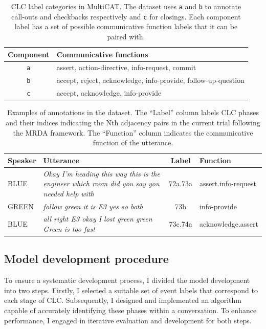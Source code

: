 \documentclass[11pt]{article}
\begin{document}
\begin{table}
    \centering
    \footnotesize
    \begin{tabularx}{\linewidth}{cX}
    \toprule
    Component & Communicative functions \\
    \midrule
       \texttt{a} & assert, action-directive, info-request, commit \\
       \texttt{b} & accept, reject, acknowledge, info-provide, follow-up-question \\
       \texttt{c} & accept, acknowledge, info-provide \\
       \bottomrule
    \end{tabularx}
    \caption{%
        CLC label categories in MultiCAT.
        The dataset uses \texttt{a} and \texttt{b} to annotate call-outs and checkbacks respectively and \texttt{c} for closings. Each component label has a set of possible communicative function labels that it can be paired with. 
    }
    \label{tab:clc-label-category}
\end{table}

\begin{table}
    \centering
    \footnotesize
    \begin{tabularx}{\linewidth}{p{0.8cm}XcX}
    \toprule
     Speaker & Utterance &  Label & Function\\
     \midrule
     BLUE & \emph{Okay I'm heading this way this is the engineer which room did you say you needed help with}    & 72a.73a & assert.info-request\\
     GREEN & \emph{follow green it is E3 yes so both} & 73b & info-provide\\
     BLUE & \emph{all right E3 okay I lost green green Green is too fast} & 73c.74a & acknowledge.assert\\
     \bottomrule
    \end{tabularx}
    \caption{Examples of annotations in the dataset. The ``Label'' column labels CLC phases and their indices indicating the Nth adjacency pairs in the current trial following the MRDA framework. The ``Function'' column indicates the communicative function of the utterance.}
    \label{tab:clc-annotation-example}
\end{table}

\subsection{Model development procedure}
To ensure a systematic development process, I divided the model development into two steps. Firstly, I selected a suitable set of event labels that correspond to each stage of CLC. Subsequently, I designed and implemented an algorithm capable of accurately identifying these phases within a conversation. To enhance performance, I engaged in iterative evaluation and development for both steps.
\end{document}
